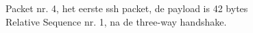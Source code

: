 Packet nr. 4, het eerste ssh packet, de payload is 42 bytes\\

Relative Sequence nr. 1, na de three-way handshake.
